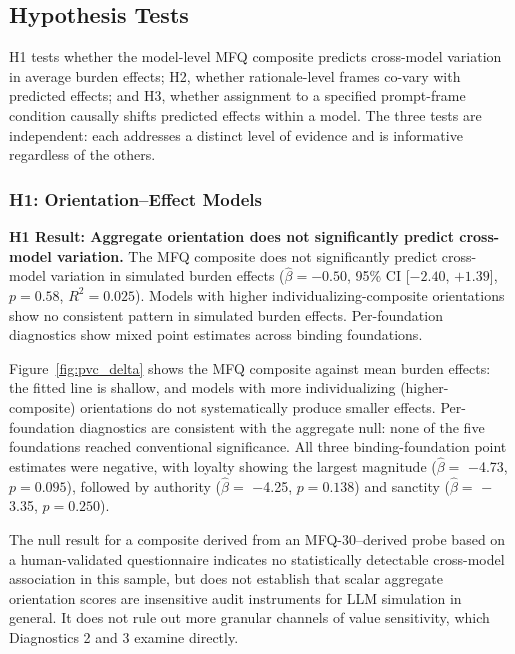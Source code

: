 \documentclass[12pt,a4paper]{article}
\begin{document}
\subsection{Hypothesis Tests}
\label{sec:results-hypotheses}

H1 tests whether the model-level MFQ composite predicts cross-model variation in average burden effects; H2, whether rationale-level frames co-vary with predicted effects; and H3, whether assignment to a specified prompt-frame condition causally shifts predicted effects within a model. The three tests are independent: each addresses a distinct level of evidence and is informative regardless of the others.

\subsubsection{H1: Orientation--Effect Models}
\label{subsubsec:results-h1}

\textbf{H1 Result: Aggregate orientation does not significantly predict cross-model variation.} The MFQ composite does not significantly predict cross-model variation in simulated burden effects ($\hat{\beta} = -0.50$, 95\% CI [$-2.40$, $+1.39$], $p = 0.58$, $R^2 = 0.025$). Models with higher individualizing-composite orientations show no consistent pattern in simulated burden effects. Per-foundation diagnostics show mixed point estimates across binding foundations.

Figure~\ref{fig:pvc_delta} shows the MFQ composite against mean burden effects: the fitted line is shallow, and models with more individualizing (higher-composite) orientations do not systematically produce smaller effects. Per-foundation diagnostics are consistent with the aggregate null: none of the five foundations reached conventional significance. All three binding-foundation point estimates were negative, with loyalty showing the largest magnitude ($\hat{\beta}=$ $-$4.73, $p=0.095$), followed by authority ($\hat{\beta}=$ $-$4.25, $p=0.138$) and sanctity ($\hat{\beta}=$ $-$3.35, $p=0.250$).

The null result for a composite derived from an MFQ-30--derived probe based on a human-validated questionnaire indicates no statistically detectable cross-model association in this sample, but does not establish that scalar aggregate orientation scores are insensitive audit instruments for LLM simulation in general. It does not rule out more granular channels of value sensitivity, which Diagnostics 2 and 3 examine directly.
\end{document}
